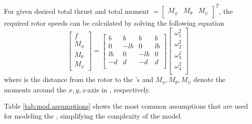 For given desired total thrust  and total moment $=\begin{bmatrix}	M_\phi&M_\theta&M_\psi	\end{bmatrix}^T  $, the required rotor speeds can be calculated by solving the following equation
\begin{equation}\label{eq:omega_i}
\begin{bmatrix}
f\\M_\phi\\M_\theta\\M_\psi
\end{bmatrix}=
\begin{bmatrix}
b&b&b&b\\
0&-lb&0&lb\\
lb&0&-lb&0\\
-d&d&-d&d\\
\end{bmatrix}
\begin{bmatrix}
\omega_1^2\\
\omega_2^2\\
\omega_3^2\\
\omega_4^2\\
\end{bmatrix}
\end{equation}
where  is the distance from the rotor to the 's  and $ M_\phi, M_\theta, M_\psi $ denote the moments around the $ x, y, z $-axis in \BF, respectively. 

Table \ref{tab:mod.assumptions} shows the most common assumptions that are used for modeling the , simplifying the complexity of the model.


